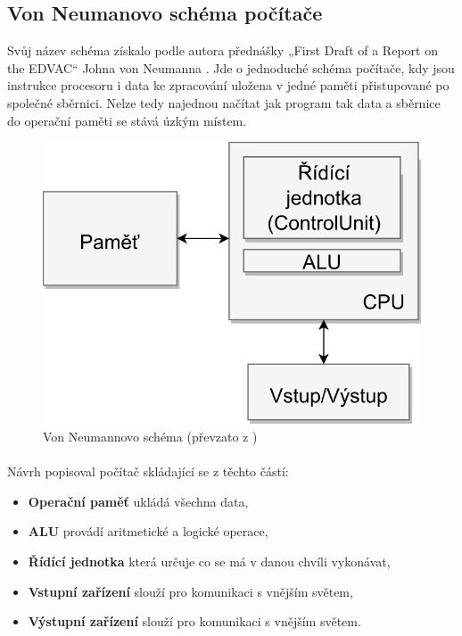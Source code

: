 \documentclass[FM,BP]{tulthesis}
\begin{document}
\subsection{Von Neumanovo schéma počítače} \label{kap:Von Neumanovo schéma počítače}
Svůj název schéma získalo podle autora přednášky „First Draft of a Report on the EDVAC“ Johna von Neumanna \cite{First_Draft}. Jde o jednoduché schéma počítače, kdy jsou instrukce procesoru i data ke zpracování uložena v jedné paměti přistupované po společné sběrnici. Nelze tedy najednou načítat jak program tak data a sběrnice do operační paměti se stává úzkým místem. \cite{VNEUM}

\begin{figure}[h]
    \includegraphics[scale=1]{assets/Von_Neumann_Architecture.png}
    \centering
    \caption{Von Neumannovo schéma (převzato z \cite{Schema_pc})}
    \label{img:VonNeumann}
\end{figure}

\paragraph{}
Návrh popisoval počítač skládající se z těchto částí:
\begin{itemize}
    \item \textbf{Operační paměť} ukládá všechna data,
    \item \textbf{ALU} provádí aritmetické a logické operace,
    \item \textbf{Řídící jednotka} která určuje co se má v danou chvíli vykonávat,
    \item \textbf{Vstupní zařízení} slouží pro komunikaci s vnějším světem,
    \item \textbf{Výstupní zařízení} slouží pro komunikaci s vnějším světem.
\end{itemize}
\end{document}
